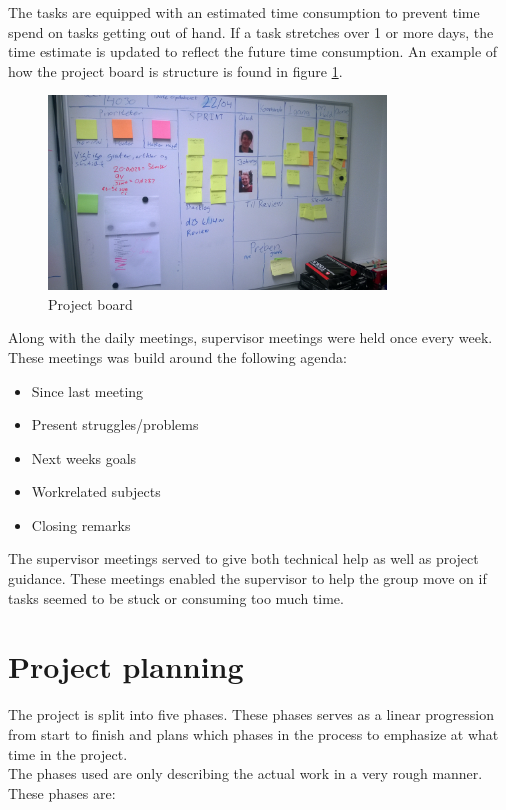 The tasks are equipped with an estimated time consumption to prevent time spend on tasks getting out of hand. If a task stretches over 1 or more days, the time estimate is updated to reflect the future time consumption. An example of how the project board is structure is found in figure \ref{fig:prjboard}.

\begin{figure}[hbpt]
	\centering
	\includegraphics[width=0.8\textwidth]{billeder/9projectexecution/board}
	\caption{Project board}
	\label{fig:prjboard}
\end{figure}

Along with the daily meetings, supervisor meetings were held once every week. These meetings was build around the following agenda:
\begin{itemize}
	\item Since last meeting
	\item Present struggles/problems
	\item Next weeks goals
	\item Workrelated subjects
	\item Closing remarks
\end{itemize}

The supervisor meetings served to give both technical help as well as project guidance. These meetings enabled the supervisor to help the group move on if tasks seemed to be stuck or consuming too much time.

\section{Project planning}
The project is split into five phases. These phases serves as a linear progression from start to finish and plans which phases in the process to emphasize at what time in the project.\\
The phases used are only describing the actual work in a very rough manner. These phases are:

